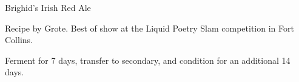 \begin{recipe}{Brighid's Irish Red Ale} %

\begin{aboutblock}
Recipe by Grote. Best of show at the Liquid Poetry Slam competition in
Fort Collins.  
\end{aboutblock}


\begin{methodandtiming}

\begin{directions}
Ferment for 7 days, transfer to secondary, and condition for an additional 14 days.
\end{directions}

\end{methodandtiming}

\recipebreak

\begin{ingredientsblock}

\begin{malts}
\end{malts}

\begin{hops}
\end{hops}


\end{ingredientsblock}

\end{recipe}

